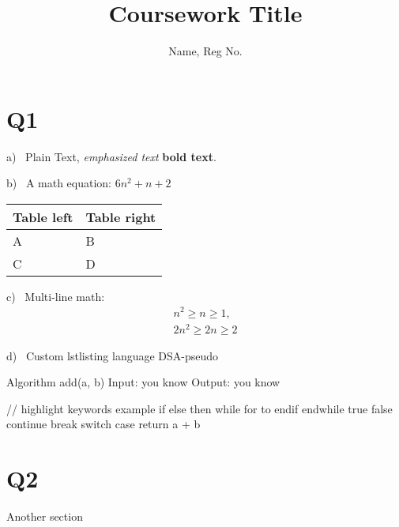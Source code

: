 \documentclass[a4paper,12pt,notitlepage]{article}
\begin{document}
\title{Coursework Title} %
\author{Name, Reg No.} %
\date{} %
\maketitle
\linespread{1.2}
\section{Q1}
    a) ~Plain Text, \emph{emphasized text} \textbf{bold text}.

    b) ~A math equation: $6n^2+n+2$
    \begin{center}
        \begin{tabular}{l|l}
            Table left        & Table right \\
            \hline
            A                 & B           \\
            C                 & D           \\
        \end{tabular}        
    \end{center}

    c) ~Multi-line math:
    \begin{gather*}
        n^2\geq n\geq 1, \\
        2n^2\geq 2n\geq 2
    \end{gather*} 
    
    d) ~Custom lstlisting language DSA-pseudo
    \begin{dsap}
        Algorithm add(a, b)
        Input: you know
        Output: you know

            // highlight keywords example
            if else then while for to endif endwhile
            true false continue break switch case
            return a + b
    \end{dsap}

\section{Q2}
    Another section
\end{document}
